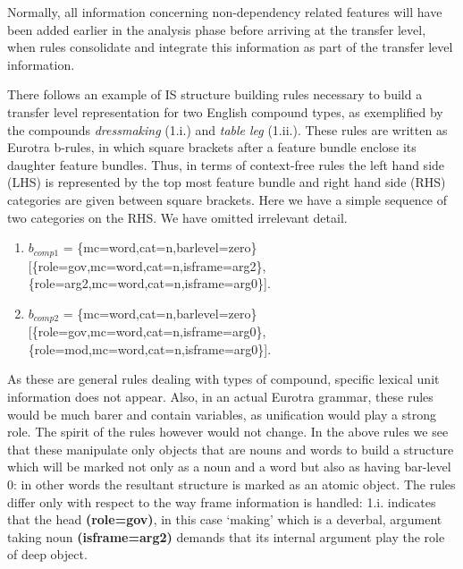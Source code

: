 Normally,   all  information  concerning  non-dependency  related 
features  will  have  been added earlier in  the  analysis  phase 
before arriving at the transfer level, when rules consolidate and 
integrate   this  information  as  part  of  the  transfer  level 
information.

There   follows   an  example  of  IS  structure  building  rules 
necessary  to  build  a transfer level representation   for   two  
English  compound   types,   as  exemplified  by  the   compounds 
{\it dressmaking}  (1.i.)  and {\it table leg} (1.ii.).  These rules  are 
written  as  Eurotra b-rules,  in which square brackets  after  a 
feature  bundle  enclose its daughter feature  bundles.  Thus, in 
terms  of  context-free  rules  the  left  hand  side  (LHS)   is 
represented  by  the top most feature bundle and right hand  side 
(RHS) categories are given between square brackets.  Here we have 
a simple sequence of two categories on the RHS. We  have 
omitted irrelevant detail.

\begin{enumerate}
\item $b_{comp1}$ = \{mc=word,cat=n,barlevel=zero\}\\
              {[\{role=gov,mc=word,cat=n,isframe=arg2\},\\
               \{role=arg2,mc=word,cat=n,isframe=arg0\}]}.

\item  $b_{comp2}$ = \{mc=word,cat=n,barlevel=zero\}\\
               {[\{role=gov,mc=word,cat=n,isframe=arg0\},\\
                \{role=mod,mc=word,cat=n,isframe=arg0\}]}.
\end{enumerate}

As  these  are  general rules dealing  with  types  of  compound, 
specific  lexical unit information does not appear.  Also,  in an 
actual  Eurotra  grammar,  these rules would be  much  barer  and 
contain variables,  as unification would play a strong role.  The 
spirit of the rules however would not change.  In the above rules 
we  see  that these manipulate only objects that  are  nouns  and 
words  to  build a structure which will be marked not only  as  a 
noun  and a word but also as having bar-level 0:  in other  words 
the resultant structure is marked as an atomic object. 
The  rules differ only with respect to the way frame  information 
is handled: 1.i. indicates that the head {\bf (role=gov)}, in this case 
`making' which is a deverbal, argument taking noun {\bf (isframe=arg2) }
demands that its internal argument play the role of deep object.

